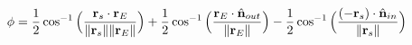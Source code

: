         \begin{theorem}
            \begin{equation*}
                \phi=\frac{1}{2}\cos^{-1}
                    \Big(\frac{\mathbf{r}_{s}\cdot
                               \mathbf{r}_{E}}
                              {\lVert\mathbf{r}_{s}\rVert
                               \lVert\mathbf{r}_{E}\rVert}\Big)
                +\frac{1}{2}\cos^{-1}
                \Big(\frac{\mathbf{r}_{E}\cdot
                           \hat{\mathbf{n}}_{out}}
                          {\lVert\mathbf{r}_{E}\rVert}\Big)
                -\frac{1}{2}\cos^{-1}
                \Big(\frac{(-\mathbf{r}_{s})\cdot
                           \hat{\mathbf{n}}_{in}}
                          {\lVert\mathbf{r}_{s}\rVert}\Big)
            \end{equation*}
        \end{theorem}
